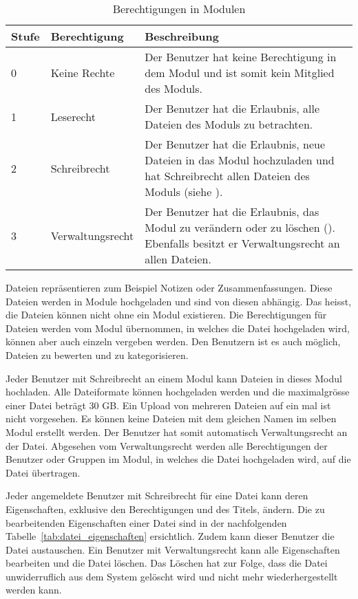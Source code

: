 \begin{table}[H]
\begin{tabularx}{\textwidth}{|l|l|X|} \hline
\textbf{Stufe} & \textbf{Berechtigung}     & \textbf{Beschreibung} \\ \hline
0     & Keine Rechte     & Der Benutzer hat keine Berechtigung in dem Modul und ist somit kein Mitglied des Moduls.\\ \hline
1     & Leserecht        & Der Benutzer hat die Erlaubnis, alle Dateien des Moduls zu betrachten.\\ \hline
2     & Schreibrecht     & Der Benutzer hat die Erlaubnis, neue Dateien in das Modul hochzuladen und hat Schreibrecht allen Dateien des Moduls (siehe {Datei bearbeiten}).\\ \hline
3     & Verwaltungsrecht & Der Benutzer hat die Erlaubnis, das Modul zu verändern oder zu löschen ({Modul bearbeiten}). Ebenfalls besitzt er Verwaltungsrecht an allen Dateien. \\ \hline
\end{tabularx}
\caption{Berechtigungen in Modulen}
\label{tab:modul_rechte}
\end{table}
Dateien repräsentieren zum Beispiel Notizen oder Zusammenfassungen. Diese Dateien werden in Module hochgeladen und sind von diesen abhängig. Das heisst, die Dateien können nicht ohne ein Modul existieren. Die Berechtigungen für Dateien werden vom Modul übernommen, in welches die Datei hochgeladen wird, können aber auch einzeln vergeben werden. Den Benutzern ist es auch möglich, Dateien zu bewerten und zu kategorisieren.

Jeder Benutzer mit Schreibrecht an einem Modul kann Dateien in dieses Modul hochladen. Alle Dateiformate können hochgeladen werden und die maximalgrösse einer Datei beträgt 30 GB. Ein Upload von mehreren Dateien auf ein mal ist nicht vorgesehen. Es können keine Dateien mit dem gleichen Namen im selben Modul erstellt werden. Der Benutzer hat somit automatisch Verwaltungsrecht an der Datei. Abgesehen vom Verwaltungsrecht werden alle Berechtigungen der Benutzer oder Gruppen im Modul, in welches die Datei hochgeladen wird, auf die Datei übertragen.

Jeder angemeldete Benutzer mit Schreibrecht für eine Datei kann deren Eigenschaften, exklusive den Berechtigungen und des Titels, ändern. Die zu bearbeitenden Eigenschaften einer Datei sind in der nachfolgenden Tabelle~\ref{tab:datei_eigenschaften} ersichtlich. Zudem kann dieser Benutzer die Datei austauschen. Ein Benutzer mit Verwaltungsrecht kann alle Eigenschaften bearbeiten und die Datei löschen. Das Löschen hat zur Folge, dass die Datei unwiderruflich aus dem System gelöscht wird und nicht mehr wiederhergestellt werden kann.

